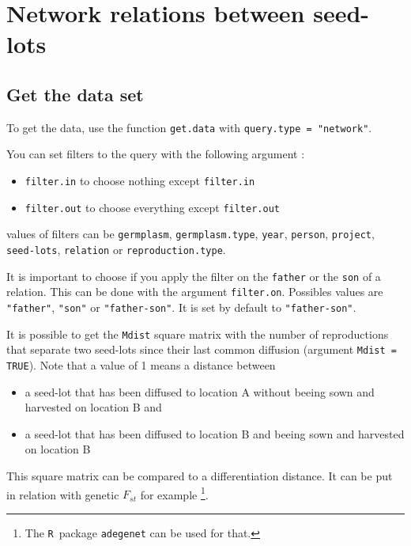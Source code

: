 \documentclass{article}\usepackage[]{graphicx}\usepackage[]{color}
\newcommand{\R}{\texttt{R}}
\renewcommand{\sl}{seed-lots}
\begin{document}
\section{Network relations between \sl }
\label{network}

\subsection{Get the data set}

To get the data, use the function \texttt{get.data} with \texttt{query.type = "network"}.

You can set filters to the query with the following argument :

\begin{itemize}
\item \texttt{filter.in} to choose nothing except \texttt{filter.in}
\item \texttt{filter.out} to choose everything except \texttt{filter.out}
\end{itemize}

values of filters can be \texttt{germplasm}, \texttt{germplasm.type}, \texttt{year}, \texttt{person}, \texttt{project}, \texttt{\sl}, \texttt{relation} or \texttt{reproduction.type}.


It is important to choose if you apply the filter on the \texttt{father} or the \texttt{son} of a relation.
This can be done with the argument \texttt{filter.on}.
Possibles values are \texttt{"father"}, \texttt{"son"} or \texttt{"father-son"}.
It is set by default to \texttt{"father-son"}.

It is possible to get the \texttt{Mdist} square matrix with the number of reproductions that separate two seed-lots since their last common diffusion (argument \texttt{Mdist = TRUE}).
Note that a value of 1 means a distance between 
\begin{itemize}
	\item a seed-lot that has been diffused to location A without beeing sown and harvested on location B and
	\item a seed-lot that has been diffused to location B and beeing sown and harvested on location B
\end{itemize}

This square matrix can be compared to a differentiation distance. 
It can be put in relation with genetic $F_{st}$ for example \citep{nei_analysis_1973}\footnote{The \R~package \texttt{adegenet} can be used for that.}.
\end{document}

